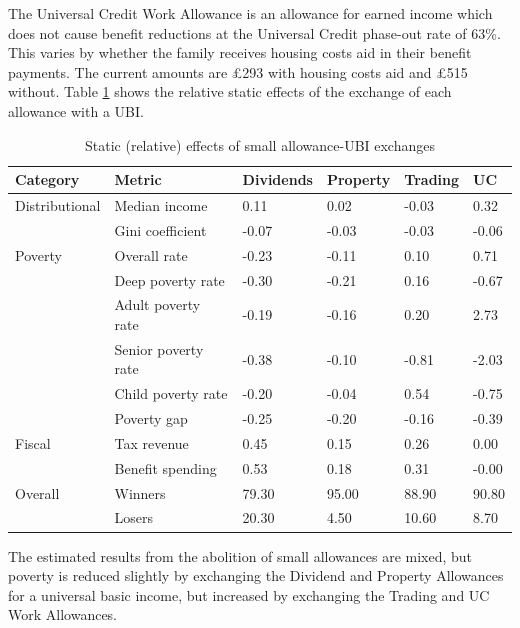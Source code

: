 \documentclass{article}
\begin{document}
    The Universal Credit Work Allowance is an allowance for earned income which does not cause benefit reductions at the Universal Credit phase-out rate of 63\%. This varies by whether the family receives housing costs aid in their benefit payments. The current amounts are £293 with housing costs aid and £515 without. Table \ref{tab:small_UBI_results} shows the relative static effects of the exchange of each allowance with a UBI.

    \begin{table}[h]
        \centering
        \begin{tabular}{llllll}
            \toprule
            Category & Metric & Dividends & Property & Trading &  UC \\
            \midrule
            Distributional & Median income &      0.11 &     0.02 &   -0.03 &   0.32 \\
                    & Gini coefficient &     -0.07 &    -0.03 &   -0.03 &  -0.06 \\
            Poverty & Overall rate &     -0.23 &    -0.11 &    0.10 &   0.71 \\
                    & Deep poverty rate &     -0.30 &    -0.21 &    0.16 &  -0.67 \\
                    & Adult poverty rate &     -0.19 &    -0.16 &    0.20 &   2.73 \\
                    & Senior poverty rate &     -0.38 &    -0.10 &   -0.81 &  -2.03 \\
                    & Child poverty rate &     -0.20 &    -0.04 &    0.54 &  -0.75 \\
                    & Poverty gap &     -0.25 &    -0.20 &   -0.16 &  -0.39 \\
            Fiscal & Tax revenue &      0.45 &     0.15 &    0.26 &   0.00 \\
                    & Benefit spending &      0.53 &     0.18 &    0.31 &  -0.00 \\
            Overall & Winners &     79.30 &    95.00 &   88.90 &  90.80 \\
                    & Losers &     20.30 &     4.50 &   10.60 &   8.70 \\
            \bottomrule
        \end{tabular}
        \caption{Static (relative) effects of small allowance-UBI exchanges}
        \label{tab:small_UBI_results}
    \end{table}
    The estimated results from the abolition of small allowances are mixed, but poverty is reduced slightly by exchanging the Dividend and Property Allowances for a universal basic income, but increased by exchanging the Trading and UC Work Allowances.
\end{document}
